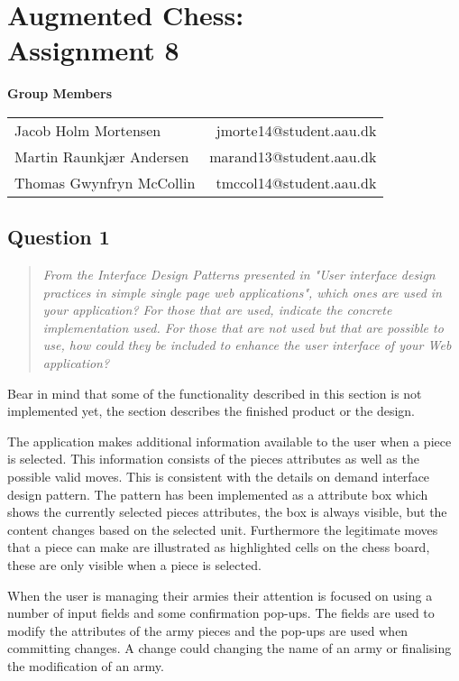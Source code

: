 \documentclass[10pt,a4paper]{report}
\begin{document}
\chapter{Augmented Chess:\\ Assignment 8}

\begin{center}
{\Large \textbf{Group Members}}

\begin{tabular}{l r}
Jacob Holm Mortensen            &       jmorte14@student.aau.dk\\
Martin Raunkjær Andersen        &       marand13@student.aau.dk\\
Thomas Gwynfryn McCollin        &       tmccol14@student.aau.dk
\end{tabular}
\end{center}

\section{Question 1}
\begin{quote}
\textit{From the Interface Design Patterns presented in "User interface design practices in simple single page web applications", which ones are used in your application? For those that are used, indicate the concrete implementation used. For those that are not used but that are possible to use, how could they be included to enhance the user interface of your Web application?}
\end{quote}
Bear in mind that some of the functionality described in this section is not implemented yet, the section describes the finished product or the design.


The application makes additional information available to the user when a piece is selected. This information consists of the pieces attributes as well as the possible valid moves. This is consistent with the details on demand interface design pattern. The pattern has been implemented as a attribute box which shows the currently selected pieces attributes, the box is always visible, but the content changes based on the selected unit. Furthermore the legitimate moves that a piece can make are illustrated as highlighted cells on the chess board, these are only visible when a piece is selected.


When the user is managing their armies their attention is focused on using a number of input fields and some confirmation pop-ups. The fields are used to modify the attributes of the army pieces and the pop-ups are used when committing changes. A change could changing the name of an army or finalising the modification of an army.
\end{document}
